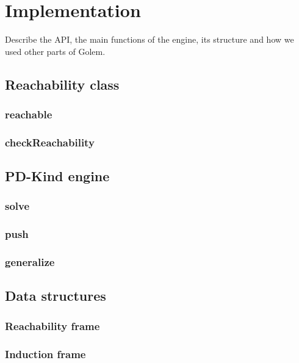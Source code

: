 \chapter{Implementation}

Describe the API, the main functions of the engine, its structure and how we used other parts of Golem.



\section{Reachability class}
\subsection{reachable}
\subsection{checkReachability}


\section{PD-Kind engine}

\subsection{solve}
\subsection{push}
\subsection{generalize}

\section{Data structures}

\subsection{Reachability frame}

\subsection{Induction frame}

